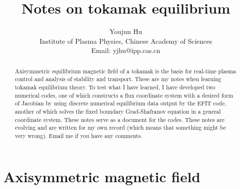 \documentclass{article}
\newcommand{\tmaffiliation}[1]{\\ #1}
\begin{document}
\title{Notes on tokamak equilibrium}

\author{
  Youjun Hu
  \tmaffiliation{Institute of Plasma Physics, Chinese Academy of Sciences\\
  Email: yjhu@ipp.cas.cn}
}

\maketitle

\begin{abstract}
  Axisymmetric equilibrium magnetic field of a tokamak is the basis for
  real-time plasma control and analysis of stability and transport. These are
  my notes when learning tokamak equilibrium theory. To test what I have
  learned, I have developed two numerical codes, one of which constructs a
  flux coordinate system with a desired form of Jacobian by using discrete
  numerical equilibrium data output by the EFIT code, another of which solves
  the fixed boundary Grad-Shafranov equation in a general coordinate system.
  These notes serve as a document for the codes. These notes are evolving and
  are written for my own record (which means that something might be very
  wrong). Email me if you have any comments.
\end{abstract}

\section{ \label{5-13-1s}Axisymmetric magnetic field}
\end{document}
